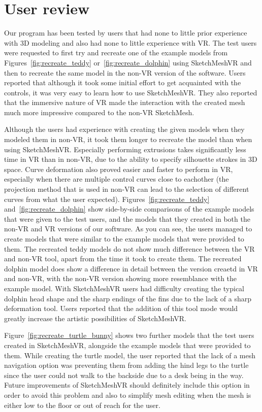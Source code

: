 \section{User review}
Our program has been tested by users that had none to little prior experience with 3D modeling and also had none to little experience with VR. The test users were requested to first try and recreate one of the example models from Figures~\ref{fig:recreate_teddy} or~\ref{fig:recreate_dolphin} using SketchMeshVR and then to recreate the same model in the non-VR version of the software. Users reported that although it took some initial effort to get acquainted with the controls, it was very easy to learn how to use SketchMeshVR. They also reported that the immersive nature of VR made the interaction with the created mesh much more impressive compared to the non-VR SketchMesh. 

Although the users had experience with creating the given models when they modeled them in non-VR, it took them longer to recreate the model than when using SketchMeshVR. Especially performing extrusions takes significantly less time in VR than in non-VR, due to the ability to specify silhouette strokes in 3D space. Curve deformation also proved easier and faster to perform in VR, especially when there are multiple control curves close to eachother (the projection method that is used in non-VR can lead to the selection of different curves from what the user expected). Figures~\ref{fig:recreate_teddy} and~\ref{fig:recreate_dolphin} show side-by-side comparisons of the example models that were given to the test users, and the models that they created in both the non-VR and VR versions of our software. As you can see, the users managed to create models that were similar to the example models that were provided to them. The recreated teddy models do not show much difference between the VR and non-VR tool, apart from the time it took to create them. The recreated dolphin model does show a difference in detail between the version creaetd in VR and non-VR, with the non-VR version showing more resemblance with the example model. With SketchMeshVR users had difficulty creating the typical dolphin head shape and the sharp endings of the fins due to the lack of a sharp deformation tool. Users reported that the addition of this tool mode would greatly increase the artistic possibilities of SketchMeshVR.

Figure~\ref{fig:recreate_turtle_bunny} shows two further models that the test users created in SketchMeshVR, alongside the example models that were provided to them. While creating the turtle model, the user reported that the lack of a mesh navigation option was preventing them from adding the hind legs to the turtle since the user could not walk to the backside due to a desk being in the way. Future improvements of SketchMeshVR should definitely include this option in order to avoid this problem and also to simplify mesh editing when the mesh is either low to the floor or out of reach for the user.

